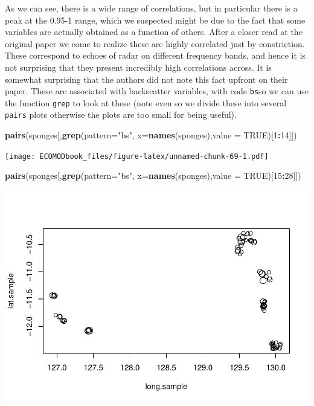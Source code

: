 \documentclass[
]{book}
\newenvironment{Shaded}{\begin{snugshade}}{\end{snugshade}}
\newcommand{\AttributeTok}[1]{\textcolor[rgb]{0.13,0.29,0.53}{#1}}
\newcommand{\ConstantTok}[1]{\textcolor[rgb]{0.56,0.35,0.01}{#1}}
\newcommand{\DecValTok}[1]{\textcolor[rgb]{0.00,0.00,0.81}{#1}}
\newcommand{\FunctionTok}[1]{\textcolor[rgb]{0.13,0.29,0.53}{\textbf{#1}}}
\newcommand{\NormalTok}[1]{#1}
\newcommand{\SpecialCharTok}[1]{\textcolor[rgb]{0.81,0.36,0.00}{\textbf{#1}}}
\newcommand{\StringTok}[1]{\textcolor[rgb]{0.31,0.60,0.02}{#1}}
\begin{document}
As we can see, there is a wide range of correlations, but in particular there is a peak at the 0.95-1 range, which we suspected might be due to the fact that some variables are actually obtained as a function of others. After a closer read at the original paper we come to realize these are highly correlated just by constriction. These correspond to echoes of radar on different frequency bands, and hence it is not surprising that they present incredibly high correlations across. It is somewhat surprising that the authors did not note this fact upfront on their paper. These are associated with backscatter variables, with code \texttt{bs}so we can use the function \texttt{grep} to look at these (note even so we divide these into several \texttt{pairs} plots otherwise the plots are too small for being useful).

\begin{Shaded}
\begin{Highlighting}[]
\FunctionTok{pairs}\NormalTok{(sponges[,}\FunctionTok{grep}\NormalTok{(}\AttributeTok{pattern=}\StringTok{"bs"}\NormalTok{, }\AttributeTok{x=}\FunctionTok{names}\NormalTok{(sponges),}\AttributeTok{value =} \ConstantTok{TRUE}\NormalTok{)[}\DecValTok{1}\SpecialCharTok{:}\DecValTok{14}\NormalTok{]])}
\end{Highlighting}
\end{Shaded}

\texttt{[image: ECOMODbook\_files/figure-latex/unnamed-chunk-69-1.pdf]}

\begin{Shaded}
\begin{Highlighting}[]
\FunctionTok{pairs}\NormalTok{(sponges[,}\FunctionTok{grep}\NormalTok{(}\AttributeTok{pattern=}\StringTok{"bs"}\NormalTok{, }\AttributeTok{x=}\FunctionTok{names}\NormalTok{(sponges),}\AttributeTok{value =} \ConstantTok{TRUE}\NormalTok{)[}\DecValTok{15}\SpecialCharTok{:}\DecValTok{28}\NormalTok{]])}
\end{Highlighting}
\end{Shaded}

\includegraphics{ECOMODbook_files/figure-latex/unnamed-chunk-69-2.pdf}
\end{document}
